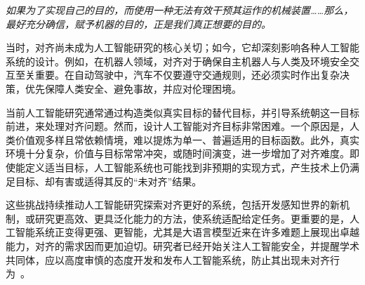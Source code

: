 \vspace{0.5em}
\begin{center}
\parbox{0.8\linewidth}{
\textit{如果为了实现自己的目的，而使用一种无法有效干预其运作的机械装置……那么，最好充分确信，赋予机器的目的，正是我们真正想要的目的。}
}
\end{center}
\vspace{0.5em}

当时，对齐尚未成为人工智能研究的核心关切；如今，它却深刻影响各种人工智能系统的设计。例如，在机器人领域，对齐对于确保自主机器人与人类及环境安全交互至关重要。在自动驾驶中，汽车不仅要遵守交通规则，还必须实时作出复杂决策，优先保障人类安全、避免事故，并应对伦理困境。

当前人工智能研究通常通过构造类似真实目标的替代目标，并引导系统朝这一目标前进，来处理对齐问题。然而，设计人工智能对齐目标非常困难。一个原因是，人类价值观多样且常依赖情境，难以提炼为单一、普遍适用的目标函数。此外，真实环境十分复杂，价值与目标常常冲突，或随时间演变，进一步增加了对齐难度。即使能定义适当目标，人工智能系统也可能找到非预期的实现方式，产生技术上仍满足目标、却有害或适得其反的“未对齐”结果。

这些挑战持续推动人工智能研究探索对齐更好的系统，包括开发感知世界的新机制，或研究更高效、更具泛化能力的方法，使系统适配给定任务。更重要的是，人工智能系统正变得更强、更智能，尤其是大语言模型近来在许多难题上展现出卓越能力，对齐的需求因而更加迫切。研究者已经开始关注人工智能安全，并提醒学术共同体，应以高度审慎的态度开发和发布人工智能系统，防止其出现未对齐行为~\cite{russell:2019human,bengio-etal:2024managing}。

